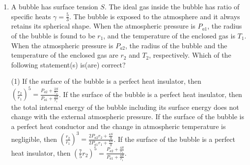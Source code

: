 \documentclass{article}
\begin{document}
\begin{enumerate}
    \item A bubble has surface tension \(S\). The ideal gas inside the bubble has ratio of specific heats \( \gamma = \frac{5}{3} \). The bubble is exposed to the atmosphere and it always retains its spherical shape. When the atmospheric pressure is \(P_{a1}\), the radius of the bubble is found to be \(r_1\), and the temperature of the enclosed gas is \(T_1\). When the atmospheric pressure is \(P_{a2}\), the radius of the bubble and the temperature of the enclosed gas are \(r_2\) and \(T_2\), respectively.
    Which of the following statement(s) is(are) correct?
    \begin{tasks}(1)
        \task If the surface of the bubble is a perfect heat insulator, then \( \left(\frac{r_2}{r_1}\right)^5 = \frac{P_{a2} + \frac{2S}{r_2}}{P_{a1} + \frac{2S}{r_1}} \).
        \task If the surface of the bubble is a perfect heat insulator, then the total internal energy of the bubble including its surface energy does not change with the external atmospheric pressure.
        \task If the surface of the bubble is a perfect heat conductor and the change in atmospheric temperature is negligible, then \( \left(\frac{r_2}{r_1}\right)^3 = \frac{2P_{a2}r_2 + \frac{4S}{3}}{2P_{a1}r_1+\frac{4S}{3}} \).
        \task If the surface of the bubble is a perfect heat insulator, then \( \left(\frac{7}{5}r_2\right)^5 = \frac{P_{a2} + \frac{4S}{r_1}}{P_{a1} + \frac{4S}{r_1}} \).
    \end{tasks}


\end{enumerate}
\end{document}
